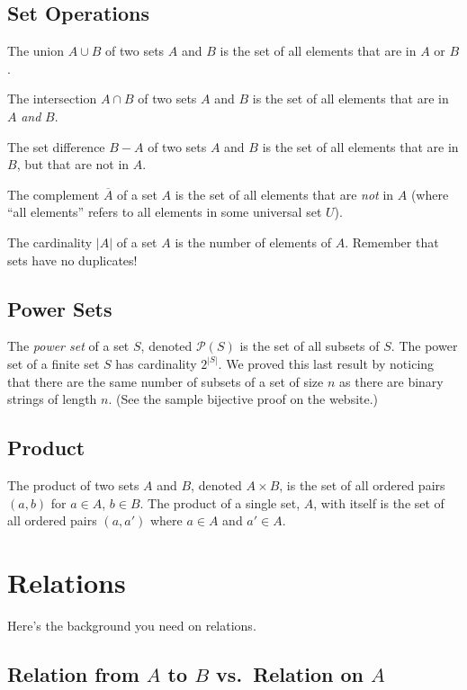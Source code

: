 \documentclass[12pt,letterpaper]{article}
\begin{document}
        
    \subsection{Set Operations}
    The union $A \cup B$ of two sets $A$ and $B$ is the set of all elements that are in $A$ or $B$.
    
    The intersection $A \cap B$ of two sets $A$ and $B$ is the set of all elements that are in $A$ \emph{and} $B$.
    
    The set difference $B - A$ of two sets $A$ and $B$ is the set of all elements that are in $B$, but that are not in $A$.
    
    The complement $\overline{A}$ of a set $A$ is the set of all elements that are \emph{not} in $A$ (where ``all elements'' refers to all elements in some universal set $U$).
    
    The cardinality $|A|$ of a set $A$ is the number of elements of $A$. Remember that sets have no duplicates!
    
    \subsection{Power Sets}
    The \textit{power set} of a set $S$, denoted $\mathcal{P}(S)$ is the set of all subsets of $S$. The power set of a finite set $S$ has cardinality $2^{|S|}$. We proved this last result by noticing that there are the same number of subsets of a set of size $n$ as there are binary strings of length $n$. (See the sample bijective proof on the website.)
        
    \subsection{Product}
    The product of two sets $A$ and $B$, denoted $A \times B$, is the set of all ordered pairs $(a,b)$ for $a \in A$, $b \in B$. The product of a single set, $A$, with itself is the set of all ordered pairs $(a,a')$ where $a \in A$ and $a'\in A$.

\section{Relations}

Here's the background you need on relations.

    \subsection{Relation from $A$ to $B$ vs.\ Relation on $A$}
    
\end{document}
